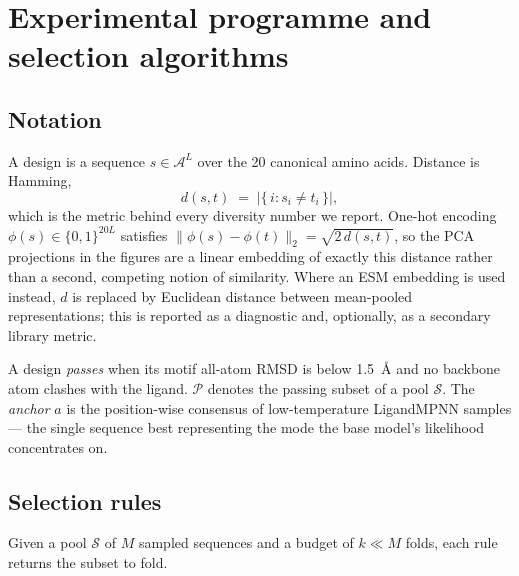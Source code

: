 \section{Experimental programme and selection algorithms}
\label{sec:experiments}


\subsection*{Notation}

A design is a sequence $s \in \mathcal{A}^L$ over the 20 canonical amino acids.
Distance is Hamming,
\[
  d(s, t) \;=\; \bigl|\{\, i : s_i \neq t_i \,\}\bigr|,
\]
which is the metric behind every diversity number we report. One-hot encoding
$\phi(s) \in \{0,1\}^{20L}$ satisfies
$\lVert \phi(s) - \phi(t) \rVert_2 = \sqrt{2\, d(s,t)}$, so the PCA projections
in the figures are a linear embedding of exactly this distance rather than a
second, competing notion of similarity. Where an ESM embedding is used instead,
$d$ is replaced by Euclidean distance between mean-pooled representations; this
is reported as a diagnostic and, optionally, as a secondary library metric.

A design \emph{passes} when its motif all-atom RMSD is below
\SI{1.5}{\angstrom} and no backbone atom clashes with the ligand. $\mathcal{P}$
denotes the passing subset of a pool $\mathcal{S}$. The
\emph{anchor} $a$ is the position-wise consensus of low-temperature LigandMPNN
samples --- the single sequence best representing the mode the base model's
likelihood concentrates on.

\subsection*{Selection rules}


Given a pool $\mathcal{S}$ of $M$ sampled sequences and a budget of $k \ll M$
folds, each rule returns the subset to fold.

